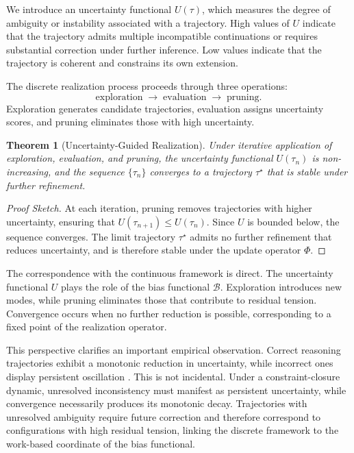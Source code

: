 \documentclass[11pt]{article}
\theoremstyle{plain}
\newtheorem{theorem}{Theorem}[section]
\theoremstyle{definition}
\theoremstyle{remark}
\begin{document}
We introduce an uncertainty functional $U(\tau)$, which measures the degree of ambiguity or instability associated with a trajectory. High values of $U$ indicate that the trajectory admits multiple incompatible continuations or requires substantial correction under further inference. Low values indicate that the trajectory is coherent and constrains its own extension.

The discrete realization process proceeds through three operations:
\[
\text{exploration} \;\rightarrow\; \text{evaluation} \;\rightarrow\; \text{pruning}.
\]
Exploration generates candidate trajectories, evaluation assigns uncertainty scores, and pruning eliminates those with high uncertainty.

\begin{theorem}[Uncertainty-Guided Realization]
Under iterative application of exploration, evaluation, and pruning, the uncertainty functional $U(\tau_n)$ is non-increasing, and the sequence $\{\tau_n\}$ converges to a trajectory $\tau^\star$ that is stable under further refinement.
\end{theorem}

\begin{proof}[Proof Sketch]
At each iteration, pruning removes trajectories with higher uncertainty, ensuring that $U(\tau_{n+1}) \leq U(\tau_n)$. Since $U$ is bounded below, the sequence converges. The limit trajectory $\tau^\star$ admits no further refinement that reduces uncertainty, and is therefore stable under the update operator $\Phi$.
\end{proof}

The correspondence with the continuous framework is direct. The uncertainty functional $U$ plays the role of the bias functional $\mathcal{B}$. Exploration introduces new modes, while pruning eliminates those that contribute to residual tension. Convergence occurs when no further reduction is possible, corresponding to a fixed point of the realization operator.

This perspective clarifies an important empirical observation. Correct reasoning trajectories exhibit a monotonic reduction in uncertainty, while incorrect ones display persistent oscillation \cite{Lightman2023}. This is not incidental. Under a constraint-closure dynamic, unresolved inconsistency must manifest as persistent uncertainty, while convergence necessarily produces its monotonic decay. Trajectories with unresolved ambiguity require future correction and therefore correspond to configurations with high residual tension, linking the discrete framework to the work-based coordinate of the bias functional.
\end{document}
